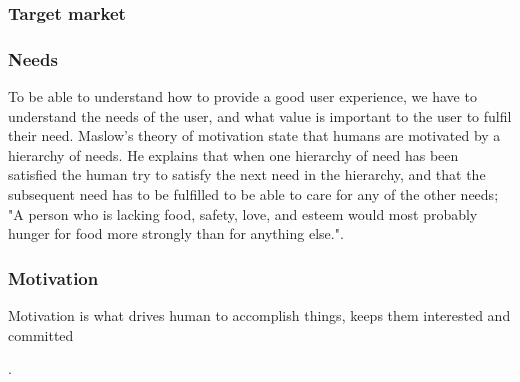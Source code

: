 \subsubsection{Target market}

\subsubsection{Needs}
To be able to understand how to provide a good user experience, we have to understand the needs of the user, and what value is important to the user to fulfil their need. Maslow’s theory of motivation \cite{Maslow1943} state that humans are motivated by a hierarchy of needs. He explains that when one hierarchy of need has been satisfied the human try to satisfy the next need in the hierarchy, and that the subsequent need has to be fulfilled to be able to care for any of the other needs; "A person who is lacking food, safety, love, and esteem would most probably hunger for food more strongly than for anything else.".


\subsubsection{Motivation}

Motivation is what drives human to accomplish things, keeps them interested and committed .

